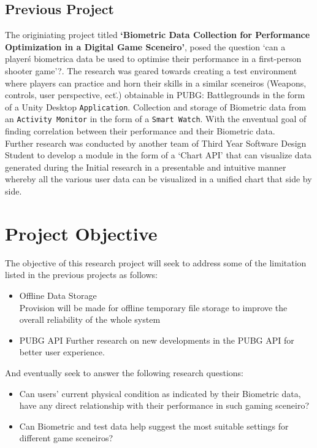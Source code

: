 \documentclass{report}
\begin{document}
    \subsection*{Previous Project}
    The originiating project titled \textbf{`Biometric Data Collection for Performance Optimization in a Digital
    Game Sceneiro'}, posed the question `can a player\'s biometrica data be used to optimise their performance in a 
    first-person shooter game'?. The research was geared towards creating a test environment where players can 
    practice and horn their skills in a similar sceneiros (Weapons, controls, user perspective, ect\..) obtainable in PUBG\:: 
    Battlegrounds in the form of a Unity Desktop {\tt Application}. Collection and storage of Biometric data from an 
    {\tt Activity Monitor} in the form of a {\tt Smart Watch}. With the enventual goal of finding correlation between their
    performance and their Biometric data. 
    \\
    
    Further research was conducted by another team of Third Year Software Design Student to develop a module in the form of a
    `Chart API' that can visualize data generated during the Initial research in a presentable and intuitive manner whereby 
    all the various user data can be visualized in a unified chart that side by side.

    
    \section*{Project Objective}
        The objective of this research project will seek to address some of the limitation listed in the previous projects as 
        follows\::
        \begin{itemize}
            \item {Offline Data Storage}\\
            Provision will be made for offline temporary file storage to improve the overall reliability of the whole system
            \item{PUBG API}
            Further research on new developments in the PUBG API for better user experience. 
        \end{itemize} 
        
        And eventually seek to answer the following research questions\::

        \begin{itemize}
            \item {Can users' current physical condition as indicated by their Biometric data, have any direct relationship with 
            their performance in such gaming sceneiro?}
            \item {Can Biometric and test data help suggest the most suitable settings for different game sceneiros?}
        \end{itemize}
\end{document}

